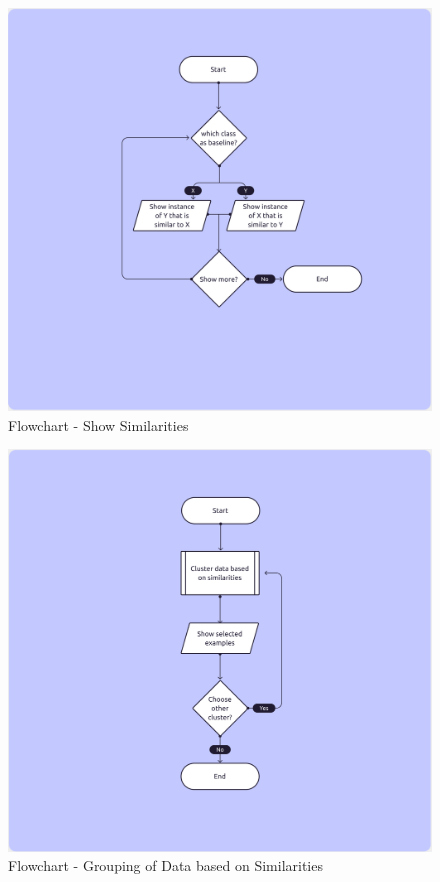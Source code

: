 \begin{figure}[htbp]
    \centering
    \includegraphics[width=\textwidth]{img/figures/flowcharts/show_similarities.png}
    \caption{Flowchart - Show Similarities}
    \label{figure:flowchart_show_similarities}
\end{figure}
\begin{figure}[htbp]
    \centering
    \includegraphics[width=\textwidth]{img/figures/flowcharts/group_data.png}
    \caption{Flowchart - Grouping of Data based on Similarities}
    \label{figure:flowchart_group_similarities}
\end{figure}
